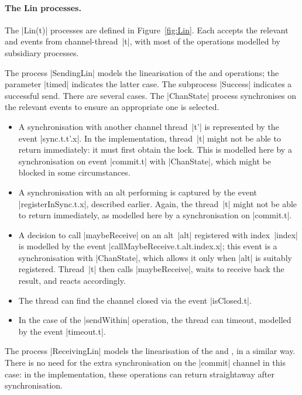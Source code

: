 
\paragraph{The {\cspmstyle Lin} processes.}

The |Lin(t)| processes are defined in Figure~\ref{fig:Lin}.  Each accepts the
relevant  and  events from channel-thread~|t|, with
most of the operations modelled by subsidiary processes.

The process |SendingLin| models the linearisation of the  and
 operations; the parameter |timed| indicates the latter case.
The subprocess |Success| indicates a successful send.  There are several
cases.  The |ChanState| process synchronises on the relevant events to ensure
an appropriate one is selected.
%
\begin{itemize}
\item A synchronisation with another channel thread~|t'| is represented by the
  event |sync.t.t'.x|.  In the implementation, thread~|t| might not be able to
  return immediately: it must first obtain the lock.  This is modelled here by
  a synchronisation on event |commit.t| with |ChanState|, which might be
  blocked in some circumstances.

\item A synchronisation with an alt performing  is captured
  by the event |registerInSync.t.x|, described earlier.  Again, the thread~|t|
  might not be able to return immediately, as modelled here by a
  synchronisation on |commit.t|.

\item A decision to call |maybeReceive| on an alt~|alt| registered with
  index~|index| is modelled by the event |callMaybeReceive.t.alt.index.x|;
  this event is a synchronisation with |ChanState|, which allows it only when
  |alt| is suitably registered.  Thread~|t| then calls |maybeReceive|, waits
  to receive back the result, and reacts accordingly.

\item The thread can find the channel closed via the event |isClosed.t|.

\item In the case of the |sendWithin| operation, the thread can timeout,
  modelled by the event |timeout.t|.  
\end{itemize}

The process |ReceivingLin| models the linearisation of the  and
, in a similar way.  There is no need for the extra
synchronisation on the |commit| channel in this case: in the implementation,
these operations can return straightaway after synchronisation. 

